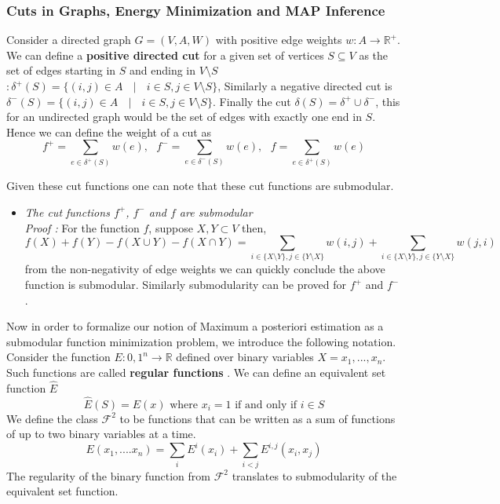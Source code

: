 \subsubsection{Cuts in Graphs, Energy Minimization and MAP Inference}
Consider a directed graph $G = (V,A,W)$ with positive edge weights $w:A\rightarrow\mathds{R}^+$. We can define a {\bf positive directed cut} for a given set of vertices $S\subseteq V$ as the set of edges starting in $S$ and ending in $V\setminus S$ $:\delta^+(S) = \{(i,j)\in A\text{ }\mid \text{ }i \in S, j\in V\setminus S\}$, Similarly a negative directed cut is $\delta^-(S) = \{(i,j)\in A\text{ }\mid \text{ }i \in S, j\in V\setminus S\}$. Finally the cut $\delta(S) = \delta^+\cup\delta^-$, this for an undirected graph would be the set of edges with exactly one end in $S$. Hence we can define the weight of a cut as
\[
 f^+ = \underset{e\in\delta^+(S)}{\operatorname{\sum}} w(e), \text{ }  f^- = \underset{e\in\delta^-(S)}{\operatorname{\sum}} w(e), \text{ } f = \underset{e\in\delta^+(S)}{\operatorname{\sum}} w(e)
\]

Given these cut functions one can note that these cut functions are submodular.

\begin{itemize}
\item {\bf \lemma} {\it The cut functions $f^+$, $f^-$ and $f$ are submodular}\\
{\it Proof :} For the function $f$, suppose $X,Y\subset V$ then,
\[
f(X) + f(Y) - f(X\cup Y) - f(X\cap Y) = \underset{i\in\{X\setminus Y\}, j\in\{Y\setminus X\}}{\operatorname{\sum}} w(i,j) + \underset{i\in\{X\setminus Y\}, j\in\{Y\setminus X\}}{\operatorname{\sum}} w(j,i)
\]
from the non-negativity of edge weights we can quickly conclude the above function is submodular. Similarly submodularity can be proved for $f^+$ and $f^-$.
\end{itemize}
 Now in order to formalize our notion of Maximum a posteriori estimation as a submodular function minimization problem, we introduce the following notation. Consider the function $E:{0,1}^n\rightarrow\mathds{R}$ defined over binary variables $X={x_1,...,x_n}$. Such functions are called \textbf{regular functions} \cite{Kolmogorov04whatenergy}. We can define an equivalent set function $\hat{E}$
\[
\hat{E}(S) = E(x) \text{ where } x_i = 1 \text{ if and only if } i \in S
\]
We define the class $\mathcal{F}^2$ to be functions that can be written as a sum of functions of up to two binary variables at a time.
\[
E(x_1,....x_n) = \underset{i}{\operatorname{\sum}} E^i(x_i) + \underset{i<j}{\operatorname{\sum}} E^{i,j}(x_i,x_j)
\]
The regularity of the binary function from $\mathcal{F}^2$ translates to submodularity of the equivalent set function. 

